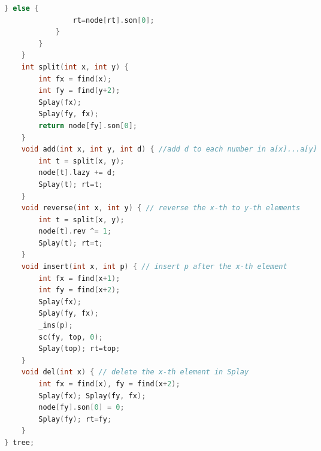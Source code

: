 \documentclass{article}
\begin{document}
\begin{CJK}{UTF8}{song}
\begin{lstlisting}[language=C++]
			} else {
				rt=node[rt].son[0];
			}
		}
	}
	int split(int x, int y) {
		int fx = find(x);
		int fy = find(y+2);
		Splay(fx);
		Splay(fy, fx);
		return node[fy].son[0];
	}
	void add(int x, int y, int d) { //add d to each number in a[x]...a[y]
		int t = split(x, y);
		node[t].lazy += d;
		Splay(t); rt=t;
	}
	void reverse(int x, int y) { // reverse the x-th to y-th elements
		int t = split(x, y);
		node[t].rev ^= 1;
		Splay(t); rt=t;
	}
	void insert(int x, int p) { // insert p after the x-th element
		int fx = find(x+1);
		int fy = find(x+2);
		Splay(fx);
		Splay(fy, fx);
		_ins(p);
		sc(fy, top, 0);
		Splay(top); rt=top;
	}
	void del(int x) { // delete the x-th element in Splay
		int fx = find(x), fy = find(x+2);
		Splay(fx); Splay(fy, fx);
		node[fy].son[0] = 0;
		Splay(fy); rt=fy;
	}
} tree;
\end{lstlisting}
\newpage

\end{CJK}
\end{document}
